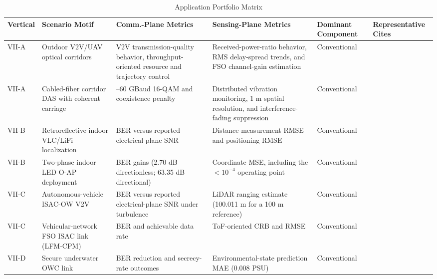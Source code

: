 \documentclass[lettersize,journal]{IEEEtran}
\begin{document}
\begin{table}[!t]
\caption{Application Portfolio Matrix}
\label{tab:section7_portfolio}
\centering
\footnotesize
\begin{tabularx}{\textwidth}{@{}%
>{\raggedright\arraybackslash}p{1.05cm}
>{\raggedright\arraybackslash}X
>{\raggedright\arraybackslash}X
>{\raggedright\arraybackslash}X
>{\raggedright\arraybackslash}p{1.45cm}
>{\raggedright\arraybackslash}p{1.9cm}
@{}}
\toprule
\textbf{Vertical} &
\textbf{Scenario Motif} &
\textbf{Comm.-Plane Metrics} &
\textbf{Sensing-Plane Metrics} &
\textbf{Dominant Component} &
\textbf{Representative Cites} \\
\midrule

VII-A &
Outdoor V2V/UAV optical corridors &
V2V transmission-quality behavior, throughput-oriented resource and trajectory control &
Received-power-ratio behavior, RMS delay-spread trends, and FSO channel-gain estimation &
Conventional &
\cite{O_ISAC_003,O_ISAC_005} \\

VII-A &
Cabled-fiber corridor DAS with coherent carriage &
50--60 GBaud 16-QAM and coexistence penalty &
Distributed vibration monitoring, 1 m spatial resolution, and interference-fading suppression &
Conventional &
\cite{O_ISAC_038,O_ISAC_074} \\

VII-B &
Retroreflective indoor VLC/LiFi localization &
BER versus reported electrical-plane SNR &
Distance-measurement RMSE and positioning RMSE &
Conventional &
\cite{O_ISAC_011} \\

VII-B &
Two-phase indoor LED O-AP deployment &
BER gains (2.70 dB directionless; 63.35 dB directional) &
Coordinate MSE, including the $<10^{-4}$ operating point &
Conventional &
\cite{O_ISAC_108} \\

VII-C &
Autonomous-vehicle ISAC-OW V2V &
BER versus reported electrical-plane SNR under turbulence &
LiDAR ranging estimate (100.011 m for a 100 m reference) &
Conventional &
\cite{O_ISAC_060} \\

VII-C &
Vehicular-network FSO ISAC link (LFM-CPM) &
BER and achievable data rate &
ToF-oriented CRB and RMSE &
Conventional &
\cite{O_ISAC_055} \\

VII-D &
Secure underwater OWC link &
BER reduction and secrecy-rate outcomes &
Environmental-state prediction MAE (0.008 PSU) &
Conventional &
\cite{O_ISAC_127} \\


\end{tabularx}
\end{table}
\end{document}
